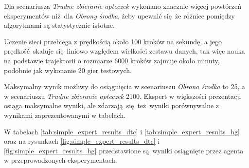 Dla scenariusza \textit{Trudne zbieranie apteczek} wykonano znacznie więcej powtórzeń eksperymentów niż dla \textit{Obrony środka}, żeby upewnić się że różnice pomiędzy algorytmami są statystycznie istotne.

Uczenie sieci przebiega z prędkością około 100 kroków na sekundę, a jego prędkość skaluje się liniowo względem wielkości zestawu danych, tak więc nauka na podstawie trajektorii o rozmiarze 6000 kroków zajmuje około minuty, podobnie jak wykonanie 20 gier testowych.

Maksymalny wynik możliwy do osiągnięcia w scenariuszu \textit{Obrona środka} to 25, a w scenariuszu \textit{Trudne zbieranie apteczek} 2100. Ekspert w większości prezentacji osiąga maksymalne wyniki, ale zdarzają się też wyniki porównywalne z wynikami zaprezentowanymi w tabelach.

W tabelach \ref{tab:simple_expert_results_dtc} i \ref{tab:simple_expert_results_hg} oraz na rysunkach \ref{fig:simple_expert_results_dtc} i \ref{fig:simple_expert_results_hg} przedstawione są wyniki osiągnięte przez agenta w przeprowadzonych eksperymentach.

\begin{figure}[H]
\end{figure}

